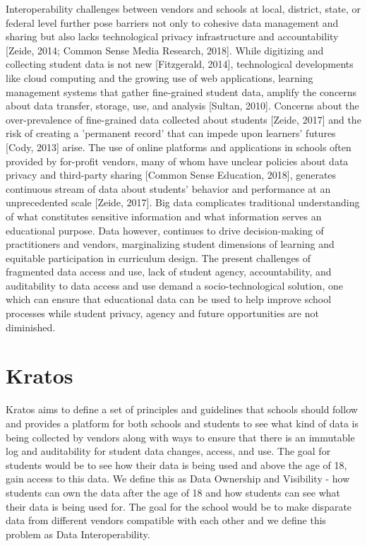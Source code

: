 \documentclass{article}
\begin{document}
Interoperability challenges between vendors and schools at local, district, state, or federal level further pose barriers not only to cohesive data management and sharing but also lacks technological privacy infrastructure and accountability [Zeide, 2014; Common Sense Media Research, 2018]. While digitizing and collecting student data is not new [Fitzgerald, 2014], technological developments like cloud computing and the growing use of web applications, learning management systems that gather fine-grained student data, amplify the concerns about data transfer, storage, use, and analysis [Sultan, 2010].
\bigbreak
Concerns about the over-prevalence of fine-grained data collected about students [Zeide, 2017] and the risk of creating a 'permanent record' that can impede upon learners' futures [Cody, 2013] arise. The use of online platforms and applications in schools often provided by for-profit vendors, many of whom have unclear policies about data privacy and third-party sharing [Common Sense Education, 2018], generates continuous stream of data about students' behavior and performance at an unprecedented scale [Zeide, 2017]. Big data complicates traditional understanding of what constitutes sensitive information and what information serves an educational purpose. Data however, continues to drive decision-making of practitioners and vendors, marginalizing student dimensions of learning and equitable participation in curriculum design.
\bigbreak
The present challenges of fragmented data access and use, lack of student agency, accountability, and auditability to data access and use demand a socio-technological solution, one which can ensure that educational data can be used to help improve school processes while student privacy, agency and future opportunities are not diminished.
\section{Kratos}
Kratos aims to define a set of principles and guidelines that schools should follow and provides a platform for both schools and students to see what kind of data is being collected by vendors along with ways to ensure that there is an immutable log and auditability for student data changes, access, and use. The goal for students would be to see how their data is being used and above the age of 18, gain access to this data. We define this as Data Ownership and Visibility - how students can own the data after the age of 18 and how students can see what their data is being used for. The goal for the school would be to make disparate data from different vendors compatible with each other and we define this problem as Data Interoperability.
\end{document}
